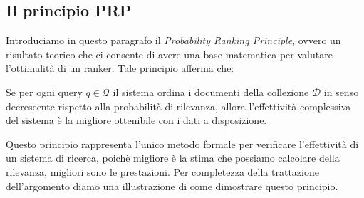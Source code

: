 \subsection{Il principio PRP}

Introduciamo in questo paragrafo il \textit{Probability Ranking Principle}, ovvero un risultato
teorico che ci consente di avere una base matematica per valutare l'ottimalità di un ranker.
Tale principio afferma che:

\begin{definizione}\label{def:prp}
	Se per ogni query $q \in \mathcal{Q}$ il sistema ordina i documenti della collezione $\mathcal{D}$ in
	senso decrescente rispetto alla probabilità di rilevanza, allora l'effettività complessiva del sistema
	è la migliore ottenibile con i dati a disposizione.
\end{definizione}

Questo principio rappresenta l'unico metodo formale per verificare l'effettività di un sistema
di ricerca, poichè migliore è la stima che possiamo calcolare della rilevanza, migliori sono
le prestazioni.
Per completezza della trattazione dell'argomento diamo
una illustrazione di come dimostrare questo principio.

